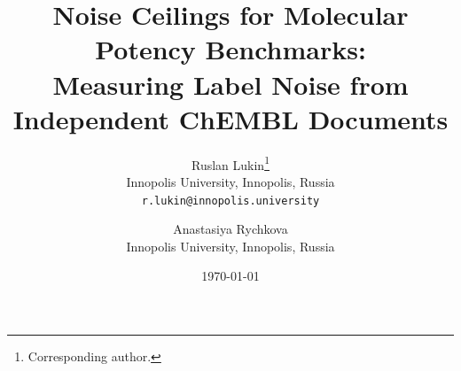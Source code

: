 \documentclass[11pt]{article}
\title{Noise Ceilings for Molecular Potency Benchmarks:\\ Measuring Label Noise from Independent ChEMBL Documents}
\author{
  Ruslan Lukin\thanks{Corresponding author.}\\ Innopolis University, Innopolis, Russia\\ \texttt{r.lukin@innopolis.university}
  \and
  Anastasiya Rychkova\\ Innopolis University, Innopolis, Russia
}
\date{\today}
\begin{document}
\doublespacing
\linenumbers
\maketitle

\end{document}
